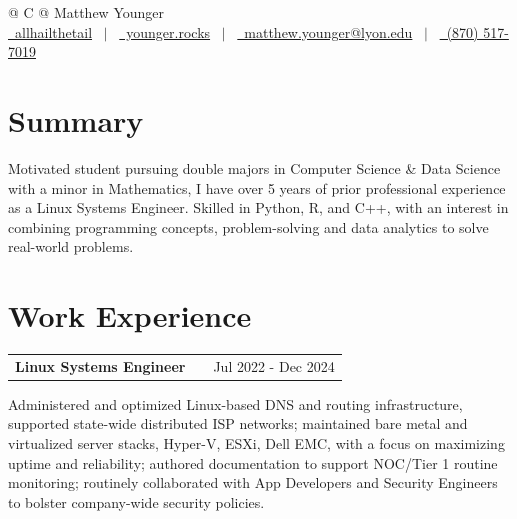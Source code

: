 \documentclass[a4paper,12pt]{article}
\makeatletter
\newenvironment{jobshort}[2]
    {
    \begin{tabularx}{\linewidth}{@{}l X r@{}}
    \textbf{#1} & \hfill &  #2 \\[3.75pt]
    \end{tabularx}
    }
    {
    }
\makeatother
\begin{document}
\pagestyle{empty}



\begin{tabularx}{\linewidth}{@{} C @{}}
\Huge{Matthew Younger} \\[7.5pt]
\href{https://github.com/allhailthetail}{\raisebox{-0.05\height}\faGithub\ allhailthetail} \ $|$ \
\href{https://blog.younger.rocks}{\raisebox{-0.05\height}\faGlobe \ younger.rocks} \ $|$ \
\href{mailto:matthew.younger@lyon.edu}{\raisebox{-0.05\height}\faEnvelope \ matthew.younger@lyon.edu} \ $|$ \
\href{tel:+18705177019}{\raisebox{-0.05\height}\faMobile \ (870) 517-7019} \\
\end{tabularx}


\section{Summary}
Motivated student pursuing double majors in Computer Science & Data Science with a minor in Mathematics, I have over 5 years of prior professional experience as a Linux Systems Engineer. Skilled in Python, R, and C++, with an interest in combining programming concepts, problem-solving and data analytics to solve real-world problems.

\section{Work Experience}

\begin{jobshort}{Linux Systems Engineer}{Jul 2022 - Dec 2024}
  Administered and optimized Linux-based DNS and routing infrastructure, supported state-wide distributed ISP networks;
  maintained bare metal and virtualized server stacks, Hyper-V, ESXi, Dell EMC, with a focus on maximizing uptime and reliability;
  authored documentation to support NOC/Tier 1 routine monitoring;
  routinely collaborated with App Developers and Security Engineers to bolster company-wide security policies.
\end{jobshort}
\end{document}
